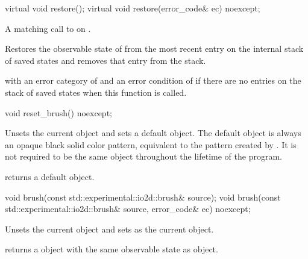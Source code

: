 \begin{itemdecl}
virtual void restore();
virtual void restore(error_code& ec) noexcept;
\end{itemdecl}
\begin{itemdescr}
	\pnum
	\requires
	A matching call to  on .
	
	\pnum
	\effects
	Restores the observable state of  from the most recent entry on the internal stack of saved states and removes that entry from the stack.
	
	\pnum
	\throws
	 with an error category of  and an error condition of  if there are no entries on the stack of saved states when this function is called.
\end{itemdescr}

\begin{itemdecl}
void reset_brush() noexcept;
\end{itemdecl}
\begin{itemdescr}
	\pnum
	\effects
	Unsets the current  object and sets a default  object.
	\enternote
	The default  object is always an opaque black solid color 
	pattern, equivalent to the pattern created by 
	. It is 
	not required to be the same object throughout the lifetime of the program.
	\exitnote
	
	\pnum
	\postconditions
	 returns a default  object.
\end{itemdescr}

\begin{itemdecl}
void brush(const std::experimental::io2d::brush& source);
void brush(const std::experimental::io2d::brush& source,
  error_code& ec) noexcept;
\end{itemdecl}
\begin{itemdescr}
	\pnum
	\effects
	Unsets the current  object and sets  as the current  object.
	
	\pnum
	\postconditions
	 returns a  object with the same observable state as  object.
\end{itemdescr}

